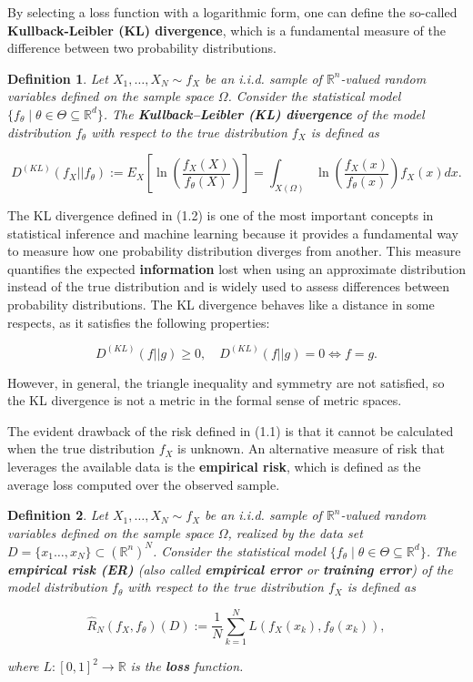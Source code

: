 \documentclass{report}
\newtheorem{definition}{Definition}[chapter]
\begin{document}
By selecting a loss function with a logarithmic form, one can define the so-called \textbf{Kullback-Leibler (KL) divergence}, which is a fundamental measure of the difference between two probability distributions.

\begin{definition}
Let $X_1,\dots,X_N \sim f_X$ be an i.i.d. sample of $\mathbb{R}^n$-valued random variables defined on the sample space $\Omega$. Consider the statistical model $\{f_\theta \mid\theta\in\Theta\subseteq\mathbb{R}^d\}$. The \textbf{Kullback–Leibler (KL) divergence} of the model distribution $f_\theta$ with respect to the true distribution $f_X$ is defined as

\begin{equation}
D^{(KL)}(f_X||f_\theta) := E_X \left[\ln\left(\frac{f_X(X)}{f_\theta(X)}\right)\right] = \int_{X(\Omega)} \ln \left( \frac{f_X(x)}{f_\theta(x)}  \right)f_X(x)dx.
\end{equation}
\end{definition}

The KL divergence defined in (1.2) is one of the most important concepts in statistical inference and machine learning because it provides a fundamental way to measure how one probability distribution diverges from another. This measure quantifies the expected \textbf{information} lost when using an approximate distribution instead of the true distribution and is widely used to assess differences between probability distributions. The KL divergence behaves like a distance in some respects, as it satisfies the following properties:

\begin{equation}
D^{(KL)}(f||g) \geq 0, \quad D^{(KL)}(f||g) = 0 \iff f = g.
\end{equation}

However, in general, the triangle inequality and symmetry are not satisfied, so the KL divergence is not a metric in the formal sense of metric spaces.

The evident drawback of the risk defined in (1.1) is that it cannot be calculated when the true distribution $f_X$ is unknown. An alternative measure of risk that leverages the available data is the \textbf{empirical risk}, which is defined as the average loss computed over the observed sample.

\begin{definition}
Let $X_1,\dots,X_N \sim f_X$ be an i.i.d. sample of $\mathbb{R}^n$-valued random variables defined on the sample space $\Omega$, realized by the data set $D = \{x_1\dots,x_N\} \subset (\mathbb{R}^n)^N$. Consider the statistical model $\{f_\theta \mid \theta \in \Theta \subseteq \mathbb{R}^d\}$. The \textbf{empirical risk (ER)} (also called \textbf{empirical error} or \textbf{training error}) of the model distribution $f_\theta$ with respect to the true distribution $f_X$ is defined as

\begin{equation}
\hat{R}_N(f_X,f_\theta)(D) := \frac{1}{N}\sum_{k=1}^{N}L(f_X(x_k),f_\theta(x_k)),
\end{equation}

where $L : [0,1]^2 \to \mathbb{R}$ is the \textbf{loss} function.
\end{definition}
\end{document}
